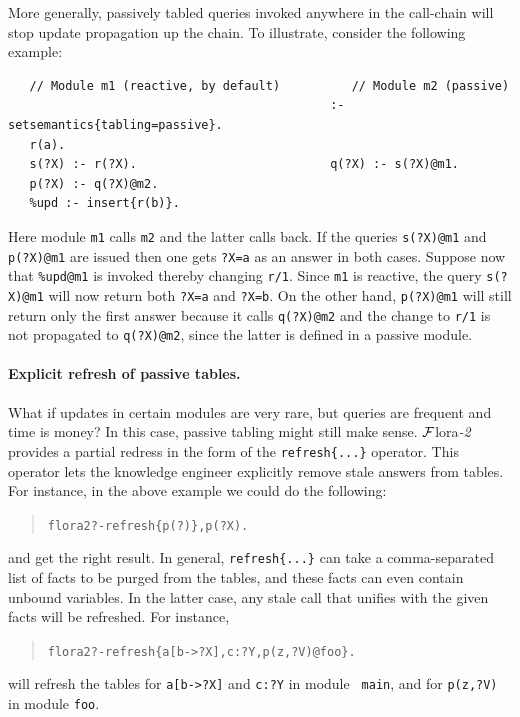 \documentclass[11pt]{article}
\newcommand{\FLORA}{{\mbox{\sc ${\cal F}${lora}\rm\emph{-2}}}\xspace}
\newcommand{\FLSYSTEM}{\FLORA}
\newcommand{\prompt}{flora2 ?- }
\begin{document}
More generally, passively tabled queries invoked anywhere in the call-chain
will stop update propagation
up the chain. To illustrate, consider the following example:
\begin{verbatim}
   // Module m1 (reactive, by default)          // Module m2 (passive)
                                             :- setsemantics{tabling=passive}.
   r(a).                                     
   s(?X) :- r(?X).                           q(?X) :- s(?X)@m1.
   p(?X) :- q(?X)@m2.
   %upd :- insert{r(b)}.
\end{verbatim}
Here module \texttt{m1}  calls \texttt{m2} and the latter calls back. If
the queries \texttt{s(?X)@m1} and
\texttt{p(?X)@m1} are issued then one gets \texttt{?X=a} as an
answer in both cases. Suppose now that \texttt{\%upd@m1} is invoked thereby changing
\texttt{r/1}. Since \texttt{m1} is reactive, the query \texttt{s(?X)@m1}
will now return both \texttt{?X=a} and \texttt{?X=b}. On the other hand,
\texttt{p(?X)@m1} will still return only the first answer because it calls
\texttt{q(?X)@m2} and the change to \texttt{r/1} is not propagated to
\texttt{q(?X)@m2}, since the latter is defined in a passive module. 



\paragraph{Explicit refresh of passive tables.}
What if updates in certain modules are very rare, but queries are
frequent and time is money?
In this case, passive tabling might still make sense.
\FLSYSTEM provides a partial redress in the form of
the {\tt refresh\{...\}} operator. This operator
lets the knowledge engineer explicitly
remove stale answers from tables. For instance, in the above example we could
do the following:
\begin{quote}
\begin{alltt}
\prompt refresh\{p(?)\}, p(?X).
\end{alltt}
\end{quote}
and get the right result.
In general, {\tt refresh\{...\}} can take a comma-separated list of facts to
be purged from the tables, and these facts can even contain unbound variables.
In the latter case, any stale call that unifies with the given facts will
be refreshed. For instance,
\begin{quote}
\begin{alltt}
\prompt refresh\{a[b->?X], c:?Y, p(z,?V)@foo\}.
\end{alltt}
\end{quote}
will refresh the tables for {\tt a[b->?X]} and {\tt c:?Y} in module {\tt
  main}, and for {\tt p(z,?V)} in module {\tt foo}.
\end{document}
